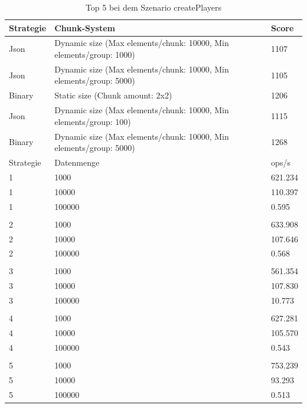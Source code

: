 \begin{table}[htp]
    \centering
    \caption{Top 5 bei dem Szenario createPlayers}
    \begin{tabular}{|l|l|l|}
    \hline
        Strategie & Chunk-System & Score \\
        \hline
        Json & Dynamic size (Max elements/chunk: 10000, Min elements/group: 1000) & 1107\\
        Json & Dynamic size (Max elements/chunk: 10000, Min elements/group: 5000) & 1105\\
        Binary & Static size (Chunk amount: 2x2) & 1206\\
        Json & Dynamic size (Max elements/chunk: 10000, Min elements/group: 100) & 1115\\
        Binary & Dynamic size (Max elements/chunk: 10000, Min elements/group: 5000) & 1268\\
        \hline
        Strategie & Datenmenge & ops/s \\
        \hline
        1 & 1000 & 621.234\\
        1 & 10000 & 110.397\\
        1 & 100000 & 0.595\\
        & & \\
        2 & 1000 & 633.908\\
        2 & 10000 & 107.646\\
        2 & 100000 & 0.568\\
        & & \\
        3 & 1000 & 561.354\\
        3 & 10000 & 107.830\\
        3 & 100000 & 10.773\\
        & & \\
        4 & 1000 & 627.281\\
        4 & 10000 & 105.570\\
        4 & 100000 & 0.543\\
        & & \\
        5 & 1000 & 753.239\\
        5 & 10000 & 93.293\\
        5 & 100000 & 0.513\\
        \hline
    \end{tabular}
    \label{tbl:createPlayers}
\end{table}

